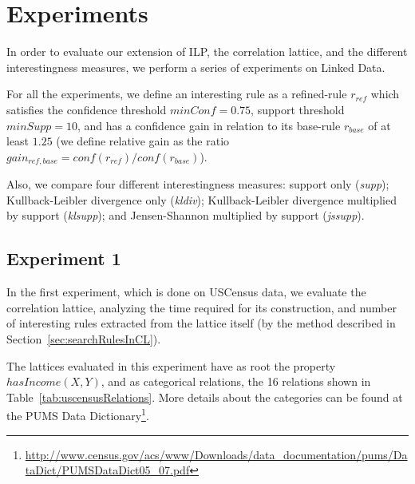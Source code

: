 \chapter{Experiments}
\label{ch:intro}

In order to evaluate our extension of ILP, the correlation lattice, and the different interestingness measures,
we perform a series of experiments on Linked Data.

For all the experiments, we define an interesting rule as a refined-rule $r_{ref}$ which satisfies the
confidence threshold $minConf=0.75$, support threshold $minSupp=10$, and has a confidence gain in relation to its
base-rule $r_{base}$ of at least $1.25$ (we define relative gain as the ratio
$gain_{ref,base}=conf(r_{ref})/conf(r_{base})$).

Also, we compare four different interestingness measures: support only (\emph{supp});
Kullback-Leibler divergence only (\emph{kldiv}); Kullback-Leibler divergence multiplied by support (\emph{klsupp}); and
Jensen-Shannon multiplied by support (\emph{jssupp}).

\section{Experiment 1}

In the first experiment, which is done on USCensus data, we evaluate the correlation lattice, analyzing the
time required for its construction, and number of interesting rules
extracted from the lattice itself (by the method described in Section~\ref{sec:searchRulesInCL}).

The lattices evaluated in this experiment have as root the property $hasIncome(X,Y)$, and as categorical relations, the
16 relations shown in Table~\ref{tab:uscensusRelations}.
More details about the categories can be found at the PUMS Data Dictionary\footnote{\url{
http://www.census.gov/acs/www/Downloads/data_documentation/pums/DataDict/PUMSDataDict05_07.pdf}}.

